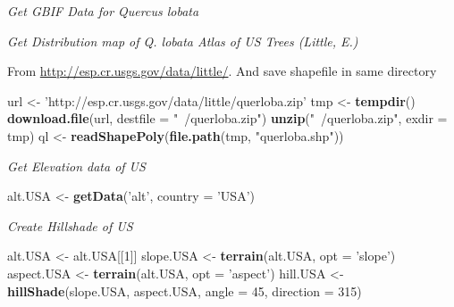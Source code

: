 \documentclass[author-year, review, 11pt]{components/elsarticle} %
\newenvironment{Shaded}{\begin{snugshade}}{\end{snugshade}}
\newcommand{\KeywordTok}[1]{\textcolor[rgb]{0.13,0.29,0.53}{\textbf{{#1}}}}
\newcommand{\DataTypeTok}[1]{\textcolor[rgb]{0.13,0.29,0.53}{{#1}}}
\newcommand{\DecValTok}[1]{\textcolor[rgb]{0.00,0.00,0.81}{{#1}}}
\newcommand{\StringTok}[1]{\textcolor[rgb]{0.31,0.60,0.02}{{#1}}}
\newcommand{\NormalTok}[1]{{#1}}
\begin{document}
\emph{Get GBIF Data for Quercus lobata}

\begin{Shaded}
\end{Shaded}

\emph{Get Distribution map of Q. lobata Atlas of US Trees (Little, E.)}

From
\href{http://esp.cr.usgs.gov/data/little/}{\url{http://esp.cr.usgs.gov/data/little/}}.
And save shapefile in same directory

\begin{Shaded}
\begin{Highlighting}[]
\NormalTok{url <-}\StringTok{ 'http://esp.cr.usgs.gov/data/little/querloba.zip'}
\NormalTok{tmp <-}\StringTok{ }\KeywordTok{tempdir}\NormalTok{()}
\KeywordTok{download.file}\NormalTok{(url, }\DataTypeTok{destfile =} \StringTok{"~/querloba.zip"}\NormalTok{)}
\KeywordTok{unzip}\NormalTok{(}\StringTok{"~/querloba.zip"}\NormalTok{, }\DataTypeTok{exdir =} \NormalTok{tmp)}
\NormalTok{ql <-}\StringTok{ }\KeywordTok{readShapePoly}\NormalTok{(}\KeywordTok{file.path}\NormalTok{(tmp, }\StringTok{"querloba.shp"}\NormalTok{))}
\end{Highlighting}
\end{Shaded}

\emph{Get Elevation data of US}

\begin{Shaded}
\begin{Highlighting}[]
\NormalTok{alt.USA <-}\StringTok{ }\KeywordTok{getData}\NormalTok{(}\StringTok{'alt'}\NormalTok{, }\DataTypeTok{country =} \StringTok{'USA'}\NormalTok{)}
\end{Highlighting}
\end{Shaded}

\emph{Create Hillshade of US}

\begin{Shaded}
\begin{Highlighting}[]
\NormalTok{alt.USA <-}\StringTok{ }\NormalTok{alt.USA[[}\DecValTok{1}\NormalTok{]]}
\NormalTok{slope.USA <-}\StringTok{ }\KeywordTok{terrain}\NormalTok{(alt.USA, }\DataTypeTok{opt =} \StringTok{'slope'}\NormalTok{)}
\NormalTok{aspect.USA <-}\StringTok{ }\KeywordTok{terrain}\NormalTok{(alt.USA, }\DataTypeTok{opt =} \StringTok{'aspect'}\NormalTok{)}
\NormalTok{hill.USA <-}\StringTok{ }\KeywordTok{hillShade}\NormalTok{(slope.USA, aspect.USA, }\DataTypeTok{angle =} \DecValTok{45}\NormalTok{, }\DataTypeTok{direction =} \DecValTok{315}\NormalTok{)}
\end{Highlighting}
\end{Shaded}
\end{document}
